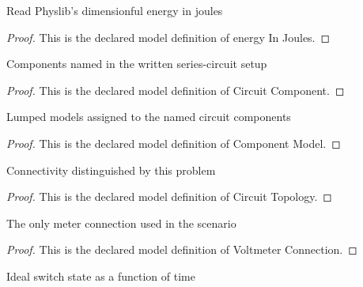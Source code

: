 \begin{definition}
  \label{def:physics:phyx-mini-0989:phyxminiproblems-problemphyxmini0989-energyinjoules}
  Read Physlib's dimensionful energy in joules
\end{definition}
\begin{proof}
  This is the declared model definition of energy In Joules.
\end{proof}
\begin{definition}
  \label{def:physics:phyx-mini-0989:phyxminiproblems-problemphyxmini0989-circuitcomponent}
  Components named in the written series-circuit setup
\end{definition}
\begin{proof}
  This is the declared model definition of Circuit Component.
\end{proof}
\begin{definition}
  \label{def:physics:phyx-mini-0989:phyxminiproblems-problemphyxmini0989-componentmodel}
  Lumped models assigned to the named circuit components
\end{definition}
\begin{proof}
  This is the declared model definition of Component Model.
\end{proof}
\begin{definition}
  \label{def:physics:phyx-mini-0989:phyxminiproblems-problemphyxmini0989-circuittopology}
  Connectivity distinguished by this problem
\end{definition}
\begin{proof}
  This is the declared model definition of Circuit Topology.
\end{proof}
\begin{definition}
  \label{def:physics:phyx-mini-0989:phyxminiproblems-problemphyxmini0989-voltmeterconnection}
  The only meter connection used in the scenario
\end{definition}
\begin{proof}
  This is the declared model definition of Voltmeter Connection.
\end{proof}
\begin{definition}
  \label{def:physics:phyx-mini-0989:phyxminiproblems-problemphyxmini0989-switchstate}
  Ideal switch state as a function of time
\end{definition}
